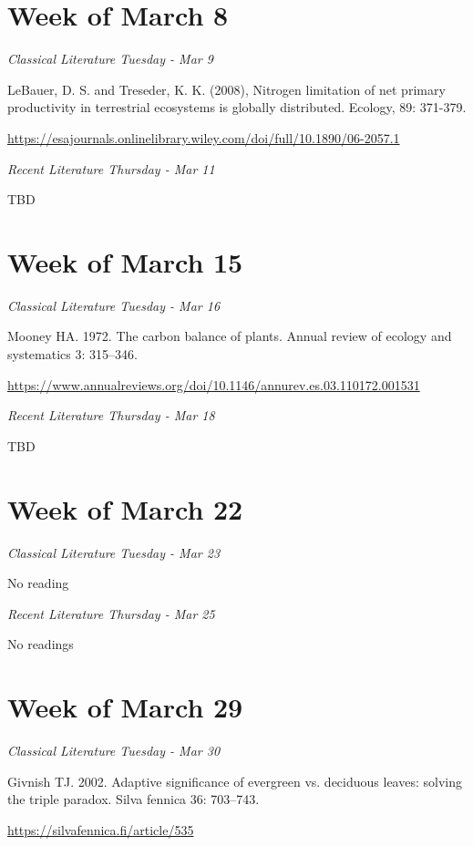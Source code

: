 \documentclass[12pt, notitlepage]{article}   	%
\begin{document}
{\section*{Week of March 8}
\textit{Classical Literature Tuesday - Mar 9} \par
LeBauer, D. S. and Treseder, K. K. (2008), Nitrogen limitation of net primary productivity
in terrestrial ecosystems is globally distributed. Ecology, 89: 371-379. \par
\url{https://esajournals.onlinelibrary.wiley.com/doi/full/10.1890/06-2057.1}

\textit{Recent Literature Thursday - Mar 11} \par
TBD \par

\section*{Week of March 15}
\textit{Classical Literature Tuesday - Mar 16} \par
Mooney HA. 1972. The carbon balance of plants. 
Annual review of ecology and systematics 3: 315–346. \par
\url{https://www.annualreviews.org/doi/10.1146/annurev.es.03.110172.001531}

\textit{Recent Literature Thursday - Mar 18} \par
TBD \par

\section*{Week of March 22}
\textit{Classical Literature Tuesday - Mar 23} \par
No reading \par

\textit{Recent Literature Thursday - Mar 25} \par
No readings \par

\section*{Week of March 29}
\textit{Classical Literature Tuesday - Mar 30} \par
Givnish TJ. 2002. Adaptive significance of evergreen vs. deciduous leaves: 
solving the triple paradox. Silva fennica 36: 703–743. \par
\url{https://silvafennica.fi/article/535}

}
\end{document}
